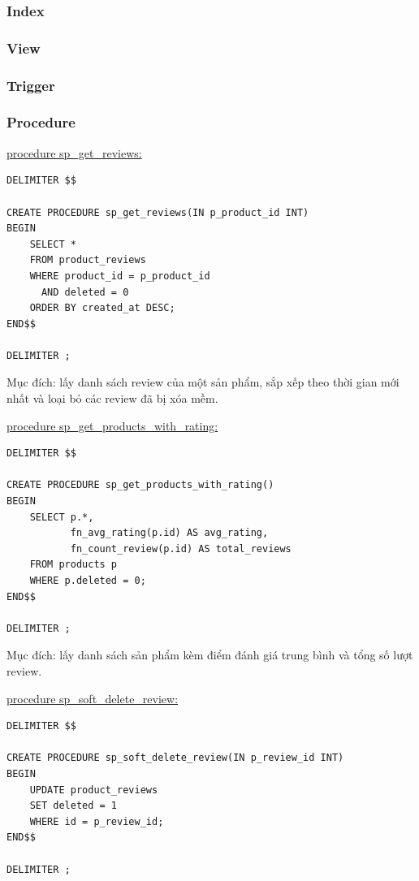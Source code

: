 \subsubsection{Index}

\subsubsection{View}

\subsubsection{Trigger}

\subsubsection{Procedure}

\underline{procedure sp\_get\_reviews:}

\begin{verbatim}
DELIMITER $$

CREATE PROCEDURE sp_get_reviews(IN p_product_id INT)
BEGIN
    SELECT *
    FROM product_reviews
    WHERE product_id = p_product_id
      AND deleted = 0
    ORDER BY created_at DESC;
END$$

DELIMITER ;
\end{verbatim}

Mục đích: lấy danh sách review của một sản phẩm, sắp xếp theo thời gian mới nhất và loại bỏ các review đã bị xóa mềm.

\underline{procedure sp\_get\_products\_with\_rating:}

\begin{verbatim}
DELIMITER $$

CREATE PROCEDURE sp_get_products_with_rating()
BEGIN
    SELECT p.*,
           fn_avg_rating(p.id) AS avg_rating,
           fn_count_review(p.id) AS total_reviews
    FROM products p
    WHERE p.deleted = 0;
END$$

DELIMITER ;
\end{verbatim}

Mục đích: lấy danh sách sản phẩm kèm điểm đánh giá trung bình và tổng số lượt review.

\underline{procedure sp\_soft\_delete\_review:}

\begin{verbatim}
DELIMITER $$

CREATE PROCEDURE sp_soft_delete_review(IN p_review_id INT)
BEGIN
    UPDATE product_reviews
    SET deleted = 1
    WHERE id = p_review_id;
END$$

DELIMITER ;
\end{verbatim}

